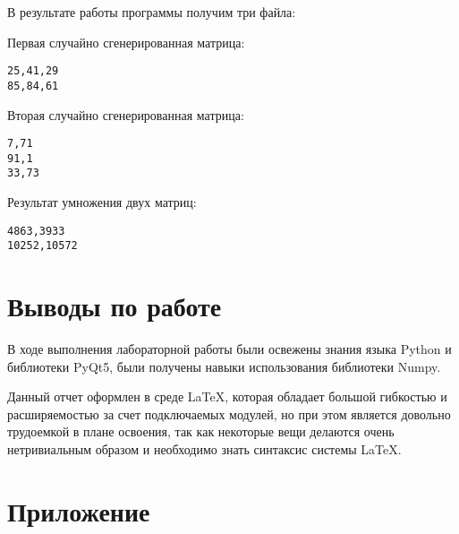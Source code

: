 \documentclass[a4paper,14pt]{extarticle}
\begin{document}
В результате работы программы получим три файла:

Первая случайно сгенерированная матрица:
\begin{verbatim}
25,41,29
85,84,61
\end{verbatim}

Вторая случайно сгенерированная матрица:
\begin{verbatim}
7,71
91,1
33,73
\end{verbatim}

Результат умножения двух матриц:
\begin{verbatim}
4863,3933
10252,10572
\end{verbatim}

\newpage

\section*{Выводы по работе}
В ходе выполнения лабораторной работы были освежены знания языка Python и библиотеки PyQt5, были получены навыки использования библиотеки Numpy.

Данный отчет оформлен в среде LaTeX, которая обладает большой гибкостью и расширяемостью за счет подключаемых модулей, но при этом является довольно трудоемкой в плане освоения, так как некоторые вещи делаются очень нетривиальным образом и необходимо знать синтаксис системы LaTeX.

\newpage

\section*{Приложение}
\inputminted[mathescape,linenos,breaklines]{python}{../src/main.py}
\end{document}
